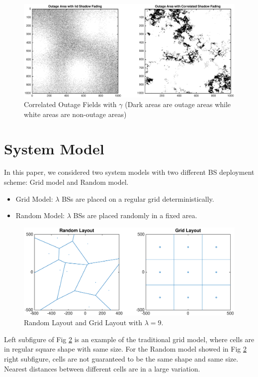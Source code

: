 \begin{figure}
\centering
\includegraphics[width=14cm]{outageArea.eps}
\caption{Correlated Outage Fields with $\gamma$ (Dark areas are outage areas while white areas are non-outage areas)}
\label{outagefie}
\end{figure}


\section{System Model}
\label{SystemModel}
In this paper, we considered two system models with two different BS deployment scheme: Grid model and Random model.
\begin{itemize}
\item Grid Model: $\lambda$ BSs are placed on a regular grid deterministically.
\item Random Model: $\lambda$ BSs are placed randomly in a fixed area.
\end{itemize}
\begin{figure}
\centering
\includegraphics[width=14cm]{systemLayout.eps}
\caption{Random Layout and Grid Layout with $\lambda = 9$.}
\label{RandomLayout}
\end{figure}
Left subfigure of Fig \ref{RandomLayout} is an example of the traditional grid model, where cells are in regular square shape with same size. For the Random model showed in Fig \ref{RandomLayout} right subfigure, cells are not guaranteed to be the same shape and same size. Nearest distances between different cells are in a large variation. 


